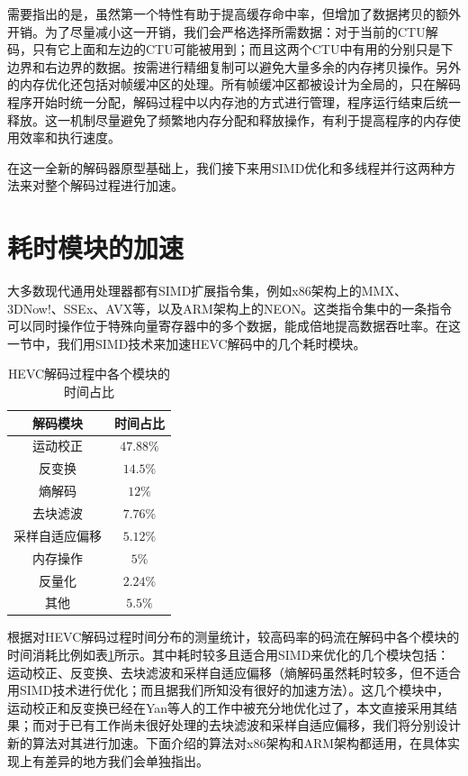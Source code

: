 需要指出的是，虽然第一个特性有助于提高缓存命中率，但增加了数据拷贝的额外开销。为了尽量减小这一开销，我们会严格选择所需数据：对于当前的CTU解码，只有它上面和左边的CTU可能被用到；而且这两个CTU中有用的分别只是下边界和右边界的数据。按需进行精细复制可以避免大量多余的内存拷贝操作。另外的内存优化还包括对帧缓冲区的处理。所有帧缓冲区都被设计为全局的，只在解码程序开始时统一分配，解码过程中以内存池的方式进行管理，程序运行结束后统一释放。这一机制尽量避免了频繁地内存分配和释放操作，有利于提高程序的内存使用效率和执行速度。

在这一全新的解码器原型基础上，我们接下来用SIMD优化和多线程并行这两种方法来对整个解码过程进行加速。

\section{耗时模块的加速}

大多数现代通用处理器都有SIMD扩展指令集，例如x86架构上的MMX、3DNow!、SSEx、AVX等\supercite{Intel-manual}，以及ARM架构上的NEON\supercite{ARM-manual}。这类指令集中的一条指令可以同时操作位于特殊向量寄存器中的多个数据，能成倍地提高数据吞吐率。在这一节中，我们用SIMD技术来加速HEVC解码中的几个耗时模块。

\begin{table}
	\begin{center}
		\caption{HEVC解码过程中各个模块的时间占比} \label{table:HEVC_timing}
		\renewcommand{\arraystretch}{1.5}
		\begin{tabular}{c|c}
			\hline
			\textbf{解码模块} & \textbf{时间占比} \\
			\hline
			\hline
			运动校正 & $47.88\%$ \\
			\hline
			反变换 & $14.5\%$ \\
			\hline
			熵解码 & $12\%$ \\
			\hline
			去块滤波 & $7.76\%$ \\
			\hline
			采样自适应偏移 & $5.12\%$ \\
			\hline
			内存操作 & $5\%$ \\
			\hline
			反量化 & $2.24\%$ \\
			\hline
			其他 & $5.5\%$ \\
			\hline
		\end{tabular}
	\end{center}
\end{table}

根据对HEVC解码过程时间分布的测量统计\supercite{Duan2014}，较高码率的码流在解码中各个模块的时间消耗比例如表\ref{table:HEVC_timing}所示。其中耗时较多且适合用SIMD来优化的几个模块包括：运动校正、反变换、去块滤波和采样自适应偏移（熵解码虽然耗时较多，但不适合用SIMD技术进行优化；而且据我们所知没有很好的加速方法）。这几个模块中，运动校正和反变换已经在Yan等人的工作\supercite{Yan-VCIP2012}中被充分地优化过了，本文直接采用其结果；而对于已有工作尚未很好处理的去块滤波和采样自适应偏移，我们将分别设计新的算法对其进行加速。下面介绍的算法对x86架构和ARM架构都适用，在具体实现上有差异的地方我们会单独指出。

